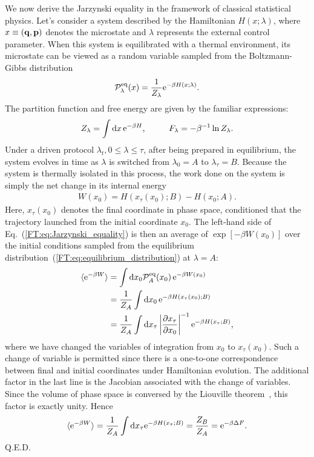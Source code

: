 \par We now derive the Jarzynski equality in the framework of classical statistical physics. Let's consider a system described by the Hamiltonian $H(x;\lambda)$, where $x\equiv({\bf q},{\bf p})$ denotes the microstate and $\lambda$ represents the external control parameter. When this system is equilibrated with a thermal environment, its microstate can be viewed as a random variable sampled from the Boltzmann-Gibbs distribution
\begin{align}
{\cal P}_{\lambda}^{\rm eq}(x)=\frac{1}{Z_{\lambda}}{\rm e}^{-\beta H(x;\lambda)} \text{.} \label{FT:eq:equilibrium_distribution}
\end{align}
The partition function and free energy are given by the familiar expressions:
\begin{align}
Z_{\lambda}=\int{\rm d}x\,{\rm e}^{-\beta H} \text{,}\hspace{1cm} F_{\lambda}=-\beta^{-1}\ln Z_{\lambda} \text{.}
\end{align}
Under a driven protocol $\lambda_t,0\le\lambda\le\tau$, after being prepared in equilibrium, the system evolves in time as $\lambda$ is switched from $\lambda_0=A$ to $\lambda_{\tau}=B$. Because the system is thermally isolated in this process, the work done on the system is simply the net change in its internal energy
\begin{align}
W(x_0)=H(x_{\tau}(x_0);B)-H(x_0;A) \text{.}
\end{align}
Here, $x_{\tau}(x_0)$ denotes the final coordinate in phase space, conditioned that the trajectory launched from the initial coordinate $x_0$. The left-hand side of Eq.~(\ref{FT:eq:Jarzynski_equality}) is then an average of $\exp[-\beta W(x_0)]$ over the initial conditions sampled from the equilibrium distribution~(\ref{FT:eq:equilibrium_distribution}) at $\lambda=A$:
\begin{align}
\langle{\rm e}^{-\beta W}\rangle & =\int{\rm d}x_0{\cal P}_A^{\rm eq}(x_0)\,{\rm e}^{-\beta W(x_0)} \nonumber \\
& =\frac{1}{Z_A}\int{\rm d}x_0\,{\rm e}^{-\beta H(x_{\tau}(x_0);B)} \nonumber \\
& =\frac{1}{Z_A}\int{\rm d}x_{\tau}\left\vert\frac{\partial x_{\tau}}{\partial x_0}\right\vert^{-1}{\rm e}^{-\beta H(x_{\tau};B)} \text{,}
\end{align}
where we have changed the variables of integration from $x_0$ to $x_{\tau}(x_0)$. Such a change of variable is permitted since there is a one-to-one correspondence between final and initial coordinates under Hamiltonian evolution. The additional factor in the last line is the Jacobian associated with the change of variables. Since the volume of phase space is conversed by the Liouville theorem~\cite{Landau_1976}, this factor is exactly unity. Hence
\begin{align}
\langle{\rm e}^{-\beta W}\rangle=\frac{1}{Z_A}\int{\rm d}x_{\tau}{\rm e}^{-\beta H(x_{\tau};B)}=\frac{Z_B}{Z_A}={\rm e}^{-\beta\Delta F} \text{.}
\end{align}
Q.E.D.











